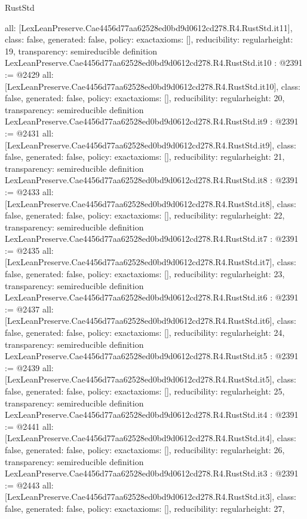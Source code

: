 \begin{lexlean}{RustStd}
\begin{coremodule}
{  all: [LexLeanPreserve.Cae4456d77aa62528ed0bd9d0612cd278.R4.RustStd.it11],
  class: false,
  generated: false,
  policy: exact{axioms: []},
  reducibility: regular{height: 19},
  transparency: semireducible
}
definition LexLeanPreserve.Cae4456d77aa62528ed0bd9d0612cd278.R4.RustStd.it10 : @2391 := @2429 {
  all: [LexLeanPreserve.Cae4456d77aa62528ed0bd9d0612cd278.R4.RustStd.it10],
  class: false,
  generated: false,
  policy: exact{axioms: []},
  reducibility: regular{height: 20},
  transparency: semireducible
}
definition LexLeanPreserve.Cae4456d77aa62528ed0bd9d0612cd278.R4.RustStd.it9 : @2391 := @2431 {
  all: [LexLeanPreserve.Cae4456d77aa62528ed0bd9d0612cd278.R4.RustStd.it9],
  class: false,
  generated: false,
  policy: exact{axioms: []},
  reducibility: regular{height: 21},
  transparency: semireducible
}
definition LexLeanPreserve.Cae4456d77aa62528ed0bd9d0612cd278.R4.RustStd.it8 : @2391 := @2433 {
  all: [LexLeanPreserve.Cae4456d77aa62528ed0bd9d0612cd278.R4.RustStd.it8],
  class: false,
  generated: false,
  policy: exact{axioms: []},
  reducibility: regular{height: 22},
  transparency: semireducible
}
definition LexLeanPreserve.Cae4456d77aa62528ed0bd9d0612cd278.R4.RustStd.it7 : @2391 := @2435 {
  all: [LexLeanPreserve.Cae4456d77aa62528ed0bd9d0612cd278.R4.RustStd.it7],
  class: false,
  generated: false,
  policy: exact{axioms: []},
  reducibility: regular{height: 23},
  transparency: semireducible
}
definition LexLeanPreserve.Cae4456d77aa62528ed0bd9d0612cd278.R4.RustStd.it6 : @2391 := @2437 {
  all: [LexLeanPreserve.Cae4456d77aa62528ed0bd9d0612cd278.R4.RustStd.it6],
  class: false,
  generated: false,
  policy: exact{axioms: []},
  reducibility: regular{height: 24},
  transparency: semireducible
}
definition LexLeanPreserve.Cae4456d77aa62528ed0bd9d0612cd278.R4.RustStd.it5 : @2391 := @2439 {
  all: [LexLeanPreserve.Cae4456d77aa62528ed0bd9d0612cd278.R4.RustStd.it5],
  class: false,
  generated: false,
  policy: exact{axioms: []},
  reducibility: regular{height: 25},
  transparency: semireducible
}
definition LexLeanPreserve.Cae4456d77aa62528ed0bd9d0612cd278.R4.RustStd.it4 : @2391 := @2441 {
  all: [LexLeanPreserve.Cae4456d77aa62528ed0bd9d0612cd278.R4.RustStd.it4],
  class: false,
  generated: false,
  policy: exact{axioms: []},
  reducibility: regular{height: 26},
  transparency: semireducible
}
definition LexLeanPreserve.Cae4456d77aa62528ed0bd9d0612cd278.R4.RustStd.it3 : @2391 := @2443 {
  all: [LexLeanPreserve.Cae4456d77aa62528ed0bd9d0612cd278.R4.RustStd.it3],
  class: false,
  generated: false,
  policy: exact{axioms: []},
  reducibility: regular{height: 27},
}
\end{coremodule}
\end{lexlean}
